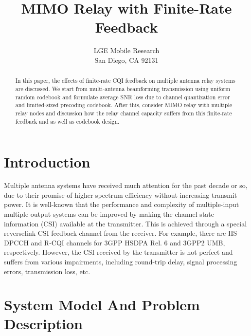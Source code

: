 \documentclass[a4paper,10pt,fleqn, twocolumn]{IEEEtran}
\title{MIMO Relay with Finite-Rate Feedback}
\author{LGE Mobile Research\\San Diego, CA 92131}
\date{}
\begin{document}
\maketitle
\begin{abstract}\small
In this paper, the effects of finite-rate CQI feedback on multiple
antenna relay systems are discussed. We start from multi-antenna
beamforming transmission using uniform random codebook and
formulate average SNR loss due to channel quantization error and
limited-sized precoding codebook. After this, consider MIMO relay
with multiple relay nodes and discussion how the relay channel
capacity suffers from this finite-rate feedback and as well as
codebook design.
\end{abstract}

\section{Introduction}
Multiple antenna systems have received much attention for the past
decade or so, due to their promise of higher spectrum efficiency
without increasing transmit power. It is well-known that the
performance and complexity of multiple-input multiple-output
systems can be improved by making the channel state information
(CSI) available at the transmitter. This is achieved through a
special reverselink CSI feedback channel from the receiver. For
example, there are HS-DPCCH and R-CQI channels for 3GPP HSDPA Rel.
6 and 3GPP2 UMB, respectively. However, the CSI received by the
transmitter is not perfect and suffers from various impairments,
including round-trip delay, signal processing errors, transmission
loss, etc.


\section{System Model And Problem Description}
\end{document}
